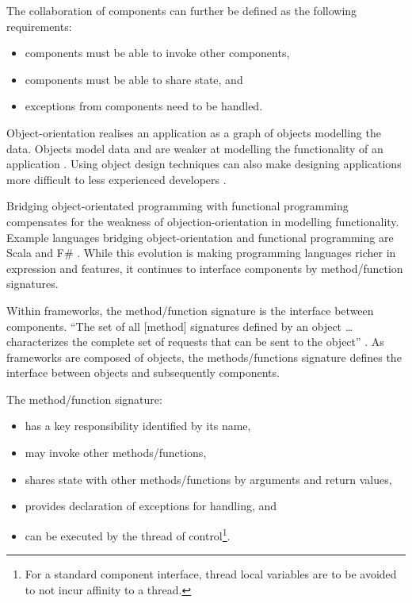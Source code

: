 \documentclass[prodmode]{style/acmlarge}
\begin{document}
The collaboration of components can further be defined as the following
requirements:
\begin{itemize}
  \item components must be able to invoke other components,
  \item components must be able to share state, and
  \item exceptions from components need to be handled.
\end{itemize}

Object-orientation realises an application as a graph of objects modelling the
data.  Objects model data and are weaker at modelling the functionality of an
application \cite{oo-behaviour}.  Using object design techniques can also make
designing applications more difficult to less experienced developers
\cite{oo-design}.

Bridging object-orientated programming with functional programming
\cite{bridging-function-oo} compensates for the weakness of
objection-orientation in modelling functionality.  Example languages bridging
object-orientation and functional programming are Scala \cite{scala} and F\#
\cite{f-sharp}.  While this evolution is making programming languages richer in
expression and features, it continues to interface components by method/function
signatures.

Within frameworks, the method/function signature is the interface between
components.  ``The set of all [method] signatures defined by an object \ldots
characterizes the complete set of requests that can be sent to the object''
\cite[p. 13]{gof}.  As frameworks are composed of objects, the methods/functions
signature defines the interface between objects and subsequently components.

The method/function signature:
\begin{itemize}
  \item has a key responsibility identified by its name,
  \item may invoke other methods/functions,
  \item shares state with other methods/functions by arguments and return values,
  \item provides declaration of exceptions for handling, and
  \item can be executed by the thread of control\footnote{For a standard component interface, thread local variables are to be avoided to not incur affinity to a thread.}.
\end{itemize}
\end{document}
